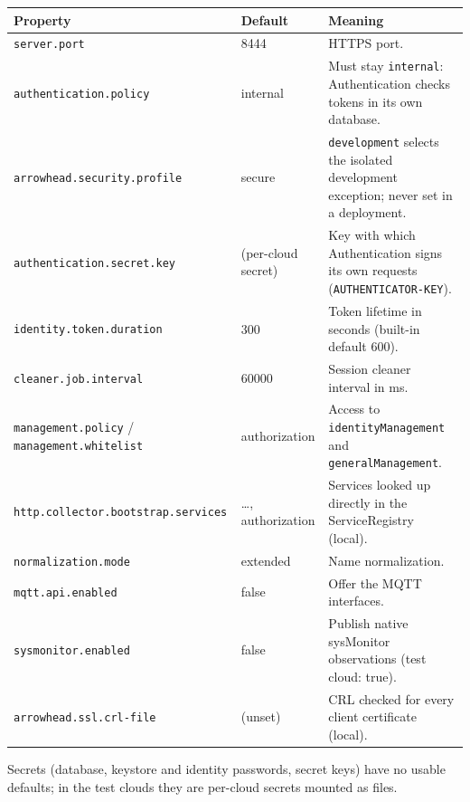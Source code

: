\documentclass[a4paper]{arrowhead}
\begin{document}
\noindent\begin{longtable}{| p{5.4cm} | p{3.4cm} | p{6.4cm} |} \hline
\rowcolor{gray!33} Property & Default & Meaning \\ \hline \endhead
\texttt{server.\allowbreak{}port} & 8444 & HTTPS port. \\ \hline
\texttt{authentication.\allowbreak{}policy} & internal & Must stay \texttt{internal}: Authentication checks tokens in its own database. \\ \hline
\texttt{arrowhead.\allowbreak{}security.\allowbreak{}profile} & secure & \texttt{development} selects the isolated development exception; never set in a deployment. \\ \hline
\texttt{authentication.\allowbreak{}secret.\allowbreak{}key} & (per-cloud secret) & Key with which Authentication signs its own requests (\texttt{AUTHENTICATOR-\allowbreak{}KEY}). \\ \hline
\texttt{identity.\allowbreak{}token.\allowbreak{}duration} & 300 & Token lifetime in seconds (built-in default 600). \\ \hline
\texttt{cleaner.\allowbreak{}job.\allowbreak{}interval} & 60000 & Session cleaner interval in ms. \\ \hline
\texttt{management.\allowbreak{}policy} / \texttt{management.\allowbreak{}whitelist} & authorization & Access to \texttt{identityManagement} and \texttt{generalManagement}. \\ \hline
\texttt{http.\allowbreak{}collector.\allowbreak{}bootstrap.\allowbreak{}services} & \ldots{}, authorization & Services looked up directly in the ServiceRegistry (local). \\ \hline
\texttt{normalization.\allowbreak{}mode} & extended & Name normalization. \\ \hline
\texttt{mqtt.\allowbreak{}api.\allowbreak{}enabled} & false & Offer the MQTT interfaces. \\ \hline
\texttt{sysmonitor.\allowbreak{}enabled} & false & Publish native sysMonitor observations (test cloud: true). \\ \hline
\texttt{arrowhead.\allowbreak{}ssl.\allowbreak{}crl-\allowbreak{}file} & (unset) & CRL checked for every client certificate (local). \\ \hline
\end{longtable}

Secrets (database, keystore and identity passwords, secret keys) have no usable defaults; in the test clouds they are per-cloud secrets mounted as files.
\end{document}
